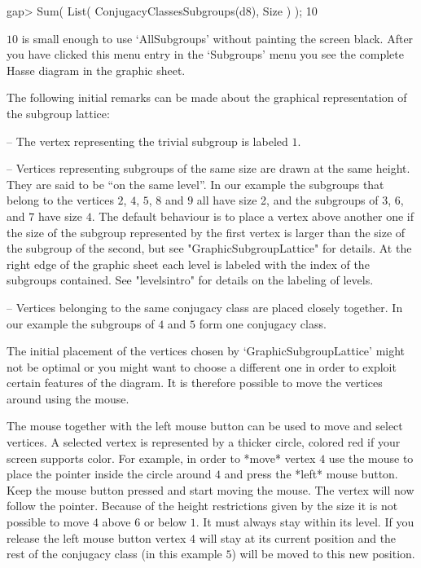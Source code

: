 \begintt
    gap> Sum( List( ConjugacyClassesSubgroups(d8), Size ) );
    10 
\endtt

$10$ is small enough to use `AllSubgroups' without painting the screen
black.  After you have clicked this menu entry in the `Subgroups' menu you
see the complete Hasse diagram in the graphic sheet.

The   following initial  remarks  can    be  made  about  the   graphical
representation of the subgroup lattice:

\beginlist
\item{--} The vertex representing the trivial subgroup is labeled $1$.
  
\item{--} Vertices representing subgroups of the same size are drawn at the
  same height. They are said to be ``on the same level''.  In our example
  the subgroups that belong to the vertices $2$, $4$, $5$, $8$ and $9$ all
  have size 2, and the subgroups of $3$, $6$, and $7$ have size $4$. The
  default behaviour is to place a vertex above another one if the size of
  the subgroup represented by the first vertex is larger than the size of
  the subgroup of the second, but see "GraphicSubgroupLattice" for details. At
  the right edge of the graphic sheet each level is labeled with the index
  of the subgroups contained. See "levelsintro" for details on the
  labeling of levels.
  
\item{--} Vertices belonging to the same conjugacy class are placed closely
  together.  In our example the subgroups of $4$ and $5$ form one conjugacy
  class.
\endlist

The initial placement of the vertices chosen by `GraphicSubgroupLattice'
might not be optimal or you might want to choose a different one in order
to exploit certain features of the diagram.  It is therefore possible to
move the vertices around using the mouse.

The mouse together with the left mouse button can be used to move and
select vertices. A selected vertex is represented by a thicker circle,
colored red if your screen supports color.  For example, in order to *move*
vertex $4$ use the mouse to place the pointer inside the circle around $4$
and press the *left* mouse button.  Keep the mouse button pressed and start
moving the mouse.  The vertex will now follow the pointer.  Because of the
height restrictions given by the size it is not possible to move $4$ above
$6$ or below $1$. It must always stay within its level. If you release the
left mouse button vertex $4$ will stay at its current position and the rest
of the conjugacy class (in this example $5$) will be moved to this new
position.

